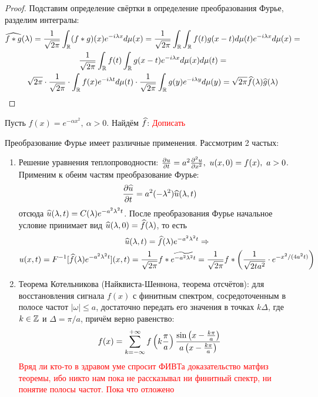 \begin{proof}
	Подставим определение свёртки в определение преобразования Фурье, разделим интегралы:
	\begin{multline*}
		\widehat{f * g}(\lambda) = \frac{1}{\sqrt{2\pi}} \int_{\mathbb{R}} (f * g)(x)e^{-i\lambda x}d\mu(x) = \frac{1}{\sqrt{2\pi}} \int_{\mathbb{R}} \int_{\mathbb{R}} f(t)g(x - t)d\mu(t)e^{-i\lambda x}d\mu(x) =
		\\
		\frac{1}{\sqrt{2\pi}} \int_{\mathbb{R}} f(t) \int_{\mathbb{R}} g(x - t)e^{-i\lambda x}d\mu(x)d\mu(t) =
		\\
		\sqrt{2\pi} \cdot \frac{1}{\sqrt{2\pi}} \cdot \int_{\mathbb{R}} f(x)e^{-i\lambda t}d\mu(t) \cdot \frac{1}{\sqrt{2\pi}} \int_{\mathbb{R}} g(y)e^{-i\lambda y}d\mu(y) = \sqrt{2\pi} \widehat{f}(\lambda) \widehat{g}(\lambda)
	\end{multline*}
\end{proof}

\begin{example}
	Пусть $f(x) = e^{-\alpha x^2},\ \alpha > 0$. Найдём $\widehat{f}$:
	\textcolor{red}{Дописать}
\end{example}

\begin{note}
	Преобразование Фурье имеет различные применения. Рассмотрим 2 частых:
	\begin{enumerate}
		\item Решение уравнения теплопроводности: $\frac{\partial u}{\partial t} = a^2 \frac{\partial ^2u}{\partial x^2},\ u(x, 0) = f(x),\ a > 0$. Применим к обеим частям преобразование Фурье:
		\[
			\frac{\partial \widehat{u}}{\partial t} = a^2 (-\lambda^2) \widehat{u}(\lambda, t)
		\]
		отсюда $\widehat{u}(\lambda, t) = C(\lambda) e^{-a^2\lambda^2 t}$. После преобразования Фурье начальное условие принимает вид $\widehat{u}(\lambda, 0) = \widehat{f}(\lambda)$, то есть
		\begin{multline*}
			\widehat{u}(\lambda, t) = \widehat{f}(\lambda) e^{-a^2\lambda^2 t} \Rightarrow
			\\
			u(x, t) = F^{-1}[\widehat{f}(\lambda) e^{-a^2\lambda^2 t}](x, t) = \frac{1}{\sqrt{2\pi}} f * \widetilde{e^{-a^2\lambda^2 t}} = \frac{1}{\sqrt{2\pi}} f * \left(\frac{1}{\sqrt{2ta^2}} \cdot e^{-x^2 / (4a^2 t)}\right)
		\end{multline*}
		
		\item Теорема Котельникова (Найквиста-Шеннона, теорема отсчётов): для восстановления сигнала $f(x)$ с финитным спектром, сосредоточенным в полосе частот $|\omega| \le a$, достаточно передать его значения в точках $k\Delta$, где $k \in \mathbb{Z}$ и $\Delta = \pi / a$, причём верно равенство:
		\[
			f(x) = \sum_{k = -\infty}^{+\infty} f\left(k\frac{\pi}{a}\right) \frac{\sin\left(x - \frac{k\pi}{a}\right)}{a\left(x - \frac{k\pi}{a}\right)}
		\]
		\textcolor{red}{Вряд ли кто-то в здравом уме спросит ФИВТа доказательство матфиз теоремы, ибо никто нам пока не рассказывал ни финитный спектр, ни понятие полосы частот. Пока что отложено}
	\end{enumerate}
\end{note}

